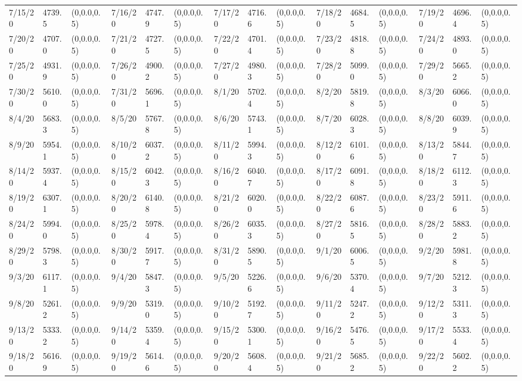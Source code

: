 \documentclass[12pt]{article}
\begin{document}
\begin{table}
\begin{center}
\begin{tabular}{p{15pt}p{15pt}p{25pt}p{15pt}p{15pt}p{25pt}p{15pt}p{15pt}p{25pt}p{15pt}p{15pt}p{25pt}p{15pt}p{15pt}p{25pt}}
            7/15/20&4739.5&(0,0.0,0.5)&7/16/20&4747.9&(0,0.0,0.5)&7/17/20&4716.6&(0,0.0,0.5)&7/18/20&4684.5&(0,0.0,0.5)&7/19/20&4696.4&(0,0.0,0.5)\\
            7/20/20&4707.0&(0,0.0,0.5)&7/21/20&4727.5&(0,0.0,0.5)&7/22/20&4701.4&(0,0.0,0.5)&7/23/20&4818.8&(0,0.0,0.5)&7/24/20&4893.0&(0,0.0,0.5)\\
            7/25/20&4931.9&(0,0.0,0.5)&7/26/20&4900.2&(0,0.0,0.5)&7/27/20&4980.3&(0,0.0,0.5)&7/28/20&5099.0&(0,0.0,0.5)&7/29/20&5665.2&(0,0.0,0.5)\\
            7/30/20&5610.0&(0,0.0,0.5)&7/31/20&5696.1&(0,0.0,0.5)&8/1/20&5702.4&(0,0.0,0.5)&8/2/20&5819.8&(0,0.0,0.5)&8/3/20&6066.0&(0,0.0,0.5)\\
            8/4/20&5683.3&(0,0.0,0.5)&8/5/20&5767.8&(0,0.0,0.5)&8/6/20&5743.1&(0,0.0,0.5)&8/7/20&6028.3&(0,0.0,0.5)&8/8/20&6039.9&(0,0.0,0.5)\\
            8/9/20&5954.1&(0,0.0,0.5)&8/10/20&6037.2&(0,0.0,0.5)&8/11/20&5994.3&(0,0.0,0.5)&8/12/20&6101.6&(0,0.0,0.5)&8/13/20&5844.7&(0,0.0,0.5)\\
            8/14/20&5937.4&(0,0.0,0.5)&8/15/20&6042.3&(0,0.0,0.5)&8/16/20&6040.7&(0,0.0,0.5)&8/17/20&6091.8&(0,0.0,0.5)&8/18/20&6112.3&(0,0.0,0.5)\\
            8/19/20&6307.1&(0,0.0,0.5)&8/20/20&6140.8&(0,0.0,0.5)&8/21/20&6020.0&(0,0.0,0.5)&8/22/20&6087.6&(0,0.0,0.5)&8/23/20&5911.6&(0,0.0,0.5)\\
            8/24/20&5994.0&(0,0.0,0.5)&8/25/20&5978.4&(0,0.0,0.5)&8/26/20&6035.3&(0,0.0,0.5)&8/27/20&5816.5&(0,0.0,0.5)&8/28/20&5883.2&(0,0.0,0.5)\\
            8/29/20&5798.3&(0,0.0,0.5)&8/30/20&5917.7&(0,0.0,0.5)&8/31/20&5890.5&(0,0.0,0.5)&9/1/20&6006.5&(0,0.0,0.5)&9/2/20&5981.8&(0,0.0,0.5)\\
            9/3/20&6117.1&(0,0.0,0.5)&9/4/20&5847.3&(0,0.0,0.5)&9/5/20&5226.6&(0,0.0,0.5)&9/6/20&5370.4&(0,0.0,0.5)&9/7/20&5212.3&(0,0.0,0.5)\\
            9/8/20&5261.2&(0,0.0,0.5)&9/9/20&5319.0&(0,0.0,0.5)&9/10/20&5192.7&(0,0.0,0.5)&9/11/20&5247.2&(0,0.0,0.5)&9/12/20&5311.3&(0,0.0,0.5)\\
            9/13/20&5333.2&(0,0.0,0.5)&9/14/20&5359.4&(0,0.0,0.5)&9/15/20&5300.1&(0,0.0,0.5)&9/16/20&5476.5&(0,0.0,0.5)&9/17/20&5533.4&(0,0.0,0.5)\\
            9/18/20&5616.9&(0,0.0,0.5)&9/19/20&5614.6&(0,0.0,0.5)&9/20/20&5608.4&(0,0.0,0.5)&9/21/20&5685.2&(0,0.0,0.5)&9/22/20&5602.2&(0,0.0,0.5)\\

\end{tabular}
\end{center}
\end{table}
\end{document}
